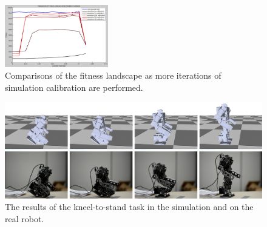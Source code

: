 \begin{figure}[!b]
  \centering
  \includegraphics[width=0.4\textwidth]{figures/fitnessLandscape}
  \caption{Comparisons of the fitness landscape as more iterations of simulation calibration are performed.}
  \label{fig:fitnessLandscape}
\end{figure}

\begin{figure}[!t]
  \centering
  \includegraphics[width=\textwidth]{figures/kneel2Stand}
  \caption{The results of the kneel-to-stand task in the simulation and on the real robot.}
  \label{fig:kneel2Stand}
\end{figure}


